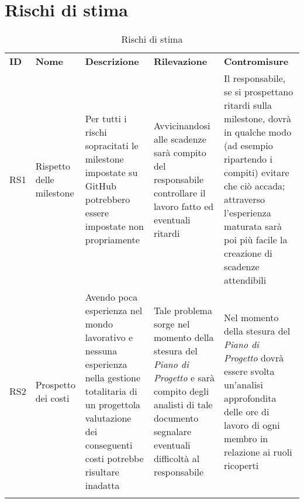 \section{Rischi di stima}
	\begin{longtable} {
		>{}p{24mm} 
		>{}p{32mm}
		>{}p{40mm} 
		>{}p{40mm}
		>{}p{40mm}
		}
	\rowcolor{gray!50}
		\textbf{ID} & \textbf{Nome} & \textbf{Descrizione} & \textbf{Rilevazione} & \textbf{Contromisure} 	\TBstrut \\
		RS1 & Rispetto delle milestone & Per tutti i rischi sopracitati le milestone impostate su GitHub potrebbero essere impostate non propriamente & Avvicinandosi alle scadenze sarà compito del responsabile controllare il lavoro fatto ed eventuali ritardi & Il responsabile, se si prospettano ritardi sulla milestone, dovrà in qualche modo (ad esempio ripartendo i compiti) evitare che ciò accada; attraverso l'esperienza maturata sarà poi più facile la creazione di scadenze attendibili \TBstrut \\ [2mm]
		RS2 & Prospetto dei costi & Avendo poca esperienza nel mondo lavorativo e nessuna esperienza nella gestione totalitaria di un progetto\glosp la valutazione dei conseguenti costi potrebbe risultare inadatta & Tale problema sorge nel momento della stesura del \textit{Piano di Progetto} e sarà compito degli analisti di tale documento segnalare eventuali difficoltà al responsabile & Nel momento della stesura del \textit{Piano di Progetto} dovrà essere svolta un'analisi approfondita delle ore di lavoro di ogni membro in relazione ai ruoli ricoperti \TBstrut \\ [2mm]
		\rowcolor{white}
		\caption{Rischi di stima}
	\end{longtable}
